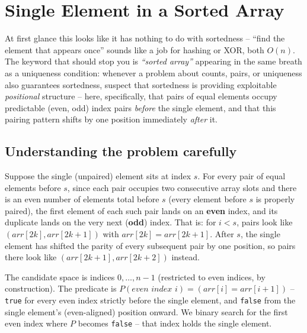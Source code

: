 \section{Single Element in a Sorted Array}
\label{sec:bs-single-element}


\begin{patternbox}
At first glance this looks like it has nothing to do with sortedness --
``find the element that appears once'' sounds like a job for hashing or
XOR, both $O(n)$. The keyword that should stop you is \emph{``sorted
array''} appearing in the same breath as a uniqueness condition: whenever a
problem about counts, pairs, or uniqueness also guarantees sortedness,
suspect that sortedness is providing exploitable \emph{positional}
structure -- here, specifically, that pairs of equal elements occupy
predictable (even, odd) index pairs \emph{before} the single element, and
that this pairing pattern shifts by one position immediately
\emph{after} it.
\end{patternbox}

\subsection*{Understanding the problem carefully}

Suppose the single (unpaired) element sits at index $s$. For every pair
of equal elements before $s$, since each pair occupies two consecutive
array slots and there is an even number of elements total before $s$ (every
element before $s$ is properly paired), the first element of each such pair
lands on an \textbf{even} index, and its duplicate lands on the very next
(\textbf{odd}) index. That is: for $i < s$, pairs look like
$(\textit{arr}[2k], \textit{arr}[2k+1])$ with $\textit{arr}[2k] =
\textit{arr}[2k+1]$. After $s$, the single element has shifted the parity
of every subsequent pair by one position, so pairs there look like
$(\textit{arr}[2k+1], \textit{arr}[2k+2])$ instead.

\begin{ideabox}
The candidate space is indices $0, \dots, n-1$ (restricted to even indices,
by construction). The predicate is
$P(\textit{even index } i) = (\textit{arr}[i] = \textit{arr}[i+1])$ --
\texttt{true} for every even index strictly before the single element, and
\texttt{false} from the single element's (even-aligned) position onward.
We binary search for the first even index where $P$ becomes \texttt{false}
-- that index holds the single element.
\end{ideabox}


